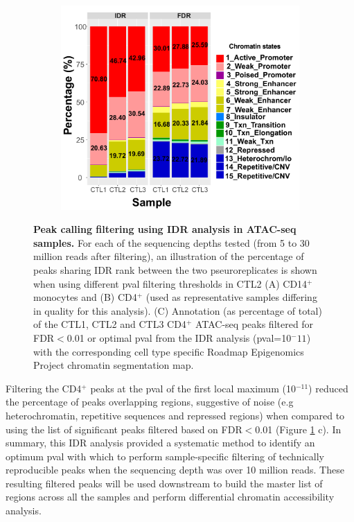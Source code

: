 \begin{figure}[htbp]
\begin{subfigure}{0.65\textwidth}
\includegraphics[width=\textwidth]{./Results1/pdfs/stacked_barplot_chromatin_states_percent_CD4_qval_vs_PVAL_IDR_filtered}
\caption{\textbf{}} %
\end{subfigure}%
\caption[Peak calling filtering using IDR analysis in ATAC-seq samples.]{\textbf{Peak calling filtering using IDR analysis in ATAC-seq samples.} For each of the sequencing depths tested (from 5 to 30 million reads after filtering), an illustration of the percentage of peaks sharing IDR rank between the two pseuroreplicates is shown when using different pval filtering thresholds in CTL2 (A) CD14$^+$ monocytes and (B) CD4$^+$ (used as representative samples differing in quality for this analysis). (C) Annotation (as percentage of total) of the CTL1, CTL2 and CTL3 CD4$^+$ ATAC-seq peaks filtered for FDR$<$0.01 or optimal pval from the IDR analysis (pval=10$^-11$) with the corresponding cell type specific Roadmap Epigenomics Project chromatin segmentation map.}
\label{figure:Peak_calling_IDR_filtering_and_chrom_stated_ATAC}
\end{figure} 


Filtering the CD4$^+$ peaks at the pval of the first local maximum (10$^{-11}$) reduced the percentage of peaks overlapping regions,  suggestive of noise (e.g heterochromatin, repetitive sequences and repressed regions) when compared to using the list of significant peaks filtered based on FDR$<$0.01 (Figure \ref{figure:Peak_calling_IDR_filtering_and_chrom_stated_ATAC} c). In summary, this IDR analysis provided a systematic method to identify an optimum pval with which to perform sample-specific filtering of technically reproducible peaks when the sequencing depth was over 10 million reads. These resulting filtered peaks will be used downstream to build the master list of regions across all the samples and perform differential chromatin accessibility analysis. 

